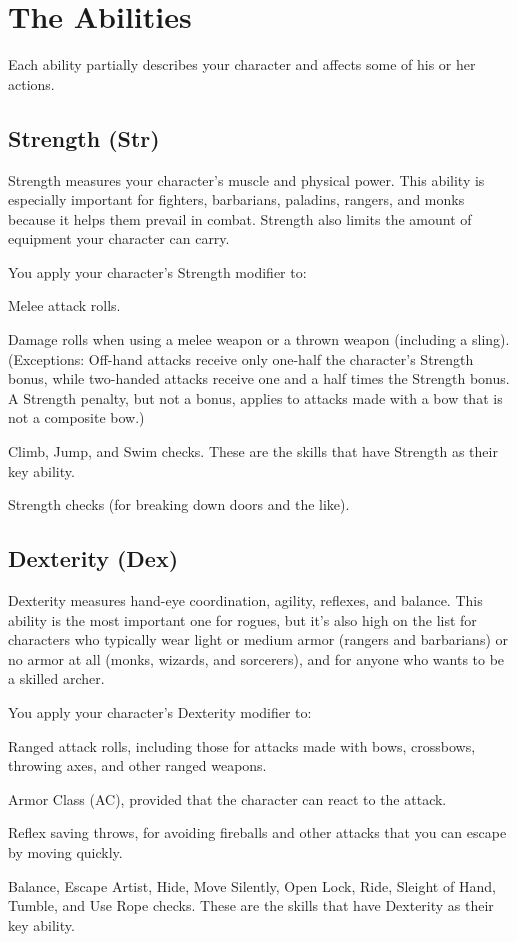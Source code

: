 \section{The Abilities}
Each ability partially describes your character and affects some of his or her actions.

\subsection{Strength (Str)}
Strength measures your character's muscle and physical power. This ability is especially important for fighters, barbarians, paladins, rangers, and monks because it helps them prevail in combat. Strength also limits the amount of equipment your character can carry.

You apply your character's Strength modifier to:
\begin{itemize*}
\item Melee attack rolls.
\item Damage rolls when using a melee weapon or a thrown weapon (including a sling). (Exceptions: Off-hand attacks receive only one-half the character's Strength bonus, while two-handed attacks receive one and a half times the Strength bonus. A Strength penalty, but not a bonus, applies to attacks made with a bow that is not a composite bow.)
\item Climb, Jump, and Swim checks. These are the skills that have Strength as their key ability.
\item Strength checks (for breaking down doors and the like).
\end{itemize*}

\subsection{Dexterity (Dex)}
Dexterity measures hand-eye coordination, agility, reflexes, and balance. This ability is the most important one for rogues, but it's also high on the list for characters who typically wear light or medium armor (rangers and barbarians) or no armor at all (monks, wizards, and sorcerers), and for anyone who wants to be a skilled archer.

You apply your character's Dexterity modifier to:
\begin{itemize*}
\item Ranged attack rolls, including those for attacks made with bows, crossbows, throwing axes, and other ranged weapons.
\item Armor Class (AC), provided that the character can react to the attack.
\item Reflex saving throws, for avoiding fireballs and other attacks that you can escape by moving quickly.
\item Balance, Escape Artist, Hide, Move Silently, Open Lock, Ride, Sleight of Hand, Tumble, and Use Rope checks. These are the skills that have Dexterity as their key ability.
\end{itemize*}
